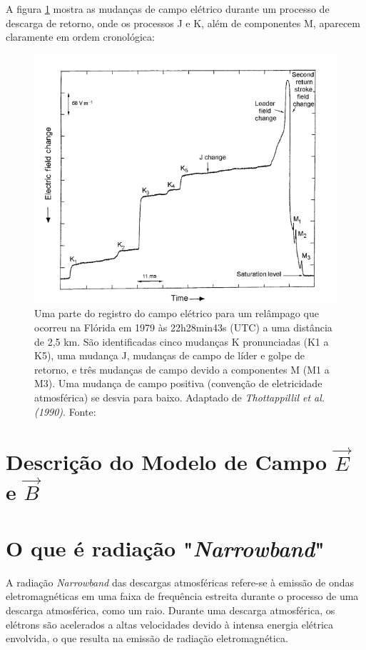 \documentclass[a4paper, 12pt, onecolumn,singlespacing]{article}
\begin{document}
		A figura \ref{process_J_K_M} mostra as mudanças de campo elétrico durante um processo de descarga de retorno, onde os processos J e K, além de componentes M, aparecem claramente em ordem cronológica:
		
		\begin{figure}[!h]
			\centering
			\includegraphics[scale=1.9]{imagens/process_J_K_EFIELD.png}
			\caption{Uma parte do registro do campo elétrico para um relâmpago que ocorreu na Flórida em 1979 às 22h28min43s (UTC) a uma distância de 2,5 km. São identificadas cinco mudanças K pronunciadas (K1 a K5), uma mudança J, mudanças de campo de líder e golpe de retorno, e três mudanças de campo devido a componentes M (M1 a M3). Uma mudança de campo positiva (convenção de eletricidade atmosférica) se desvia para baixo. Adaptado de \textit{Thottappillil et al. (1990)}. Fonte: \cite{RAKOV_UHMAN}}
			\label{process_J_K_M}
		\end{figure}
		
	\section{Descrição do Modelo de Campo $\vec{E}$ e $\vec{B}$}
	
	\section{O que é radiação "\textit{Narrowband}"}
	
		A radiação \textit{Narrowband} das descargas atmosféricas refere-se à emissão de ondas eletromagnéticas em uma faixa de frequência estreita durante o processo de uma descarga atmosférica, como um raio. Durante uma descarga atmosférica, os elétrons são acelerados a altas velocidades devido à intensa energia elétrica envolvida, o que resulta na emissão de radiação eletromagnética.
		
\end{document}
